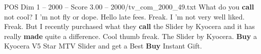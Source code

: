 \begin{textsample}{POS Dim 1 – 2000 – Score 3.00 – 2000/tv\_com\_2000\_49.txt}  \label{ex:f1_pos_080}
What do you \textbf{call} not cool?
I 'm not fly or dope.
Hello late fees.
Freak.
I 'm not very well liked.
Freak.
But I recently purchased what they \textbf{call} the Slider by Kyocera and it has really \textbf{made} quite a difference.
Cool thumb freak.
The Slider by Kyocera. \textbf{Buy} a Kyocera V5 Star MTV Slider and get a Best \textbf{Buy} Instant Gift.

\end{textsample}
